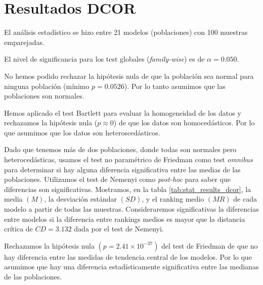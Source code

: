 \documentclass[a4paper,oneside,11pt,leqno]{article}
\begin{document}
	\section{Resultados DCOR}
	\label{sec:results_dcor}
	
	El análisis estadístico se hizo entre 21 modelos (poblaciones) con 100 muestras emparejadas.
	
	El nivel de significancia para los test globales (\textit{family-wise}) es de $\alpha=0.050$.
	
	No hemos podido rechazar la hipótesis nula de que la población sea normal para ninguna población (mínimo $p=0.0526$). Por lo tanto asumimos que las poblaciones son normales.
	
	Hemos aplicado el test Bartlett para evaluar la homogeneidad de los datos y rechazamos la hipótesis nula ($p\approx 0$) de que los datos son homocedásticos. Por lo que asumimos que los datos son heteroscedásticos.
	
	Dado que tenemos más de dos poblaciones, donde todas son normales pero heterocedásticas, usamos el test no paramétrico de Friedman como test \textit{omnibus} para determinar si hay alguna diferencia significativa entre las medias de las poblaciones. Utilizamos el test de Nemenyi como \textit{post-hoc} para saber que diferencias son significativas. Mostramos, en la tabla \ref{tab:stat_results_dcor}, la media $(M)$, la desviación estándar $(SD)$, y el ranking medio $(MR)$ de cada modelo a partir de todas las muestras. Consideraremos significativas la diferencias entre modelos si la diferencia entre rankings medios es mayor que la distancia crítica de $CD=3.132$ dada por el test de Nemenyi.

	Rechazamos la hipótesis nula $(p=2.41\times 10^{-37})$ del test de Friedman de que no hay diferencia entre las medidas de tendencia central de los modelos. Por lo que asumimos que hay una diferencia estadísticamente significativa entre las medianas de las poblaciones.
	
\end{document}
